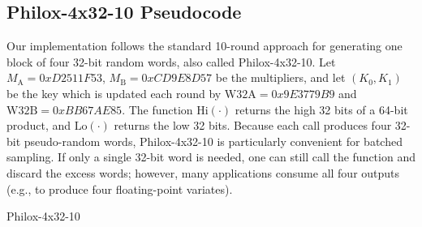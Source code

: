 \subsection{Philox-4x32-10 Pseudocode}
Our implementation follows the standard 10-round approach for generating one block of four 32-bit random words, also called Philox-4x32-10. Let \(M_{\mathrm{A}}=0xD2511F53\), \(M_{\mathrm{B}}=0xCD9E8D57\) be the multipliers, and let \((K_0, K_1)\) be the key which is updated each round by \(\mathrm{W32A}=0x9E3779B9\) and \(\mathrm{W32B}=0xBB67AE85\). The function \(\text{Hi}(\cdot)\) returns the high 32 bits of a 64-bit product, and \(\text{Lo}(\cdot)\) returns the low 32 bits. Because each call produces four 32-bit pseudo-random words, Philox-4x32-10 is particularly convenient for batched sampling. If only a single 32-bit word is needed, one can still call the function and discard the excess words; however, many applications consume all four outputs (e.g., to produce four floating-point variates).

\begin{algorithm}[ht]
\caption{Philox-4x32-10}



\end{algorithm}

